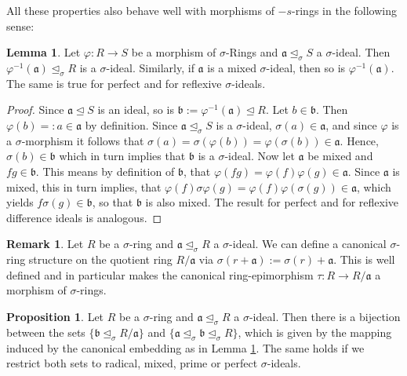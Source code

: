 \documentclass{article}
\def\a{\mathfrak{a}}
\def\b{\mathfrak{b}}
\def\s{\sigma}
\def\si{\unlhd_{\sigma}}
\newenvironment{bew}{\begin{proof}[Proof]}{\end{proof}}
\theoremstyle{definition}
\newtheorem{prop}[Satz]{Proposition}
\newtheorem{rem}[Satz]{Remark}
\newtheorem{lem}[Satz]{Lemma}
\begin{document}
All these properties also behave well with morphisms of $-s$-rings in the following sense:
\begin{lem}\label{bijmapping}
Let $\varphi: R \rightarrow S$ be a morphism of $\s$-Rings and $\a \si S$ a $\s$-ideal. Then $\varphi^{-1}(\a) \si R$ is a $\s$-ideal. Similarly, if $\a$ is a mixed $\s$-ideal, then so is $\varphi^{-1}(\a)$. The same is true for perfect and for reflexive $\s$-ideals.
\begin{bew}
Since $\a \unlhd S$ is an ideal, so is $\b := \varphi^{-1}(\a) \unlhd R$. Let $b \in \b$. Then $\varphi(b) =: a \in \a$ by definition. Since $\a \si S$ is a $\s$-ideal, $\s(a) \in \a$, and since $\varphi$ is a $\s$-morphism
 it follows that $\sigma(a) = \sigma(\varphi(b)) = \varphi (\s (b)) \in \a$. Hence, $\s(b) \in \b$ which in turn implies that $\b$ is a $\s$-ideal. Now let $\a$ be mixed and $fg \in \b$. This means by definition of $\b$, 
that $\varphi(fg) = \varphi(f) \varphi(g) \in \a$. Since $\a$ is mixed, this in turn implies, that $\varphi(f) \s \varphi(g) = \varphi(f) \varphi(\s(g)) \in \a$, which yields $f\s(g) \in \b$, so that $\b$ is also mixed. 
The result for perfect and for reflexive difference ideals is analogous.
\end{bew}
\end{lem}

\begin{rem}
Let $R$ be a $\s$-ring and $\a \si R$ a $\s$-ideal. We can define a canonical $\s$-ring structure on the quotient ring $R/\a$ via $\s(r+\a):= \s(r) + \a$. 
This is well defined and in particular makes the canonical ring-epimorphism $\tau: R \rightarrow R/\a$ a morphism of $\s$-rings.
\end{rem}

\begin{prop}\label{bijideals}
Let $R$ be a $\s$-ring and $\a \si R$ a $\s$-ideal. Then there is a bijection between the sets $\{ \b \si R/\a \}$ and $\{ \a \si \b \si R \}$, which is given by the mapping induced by the canonical embedding as in Lemma \ref{bijmapping}. The same holds if we restrict both sets to radical, mixed, prime or perfect $\s$-ideals.
\end{prop}
\end{document}
